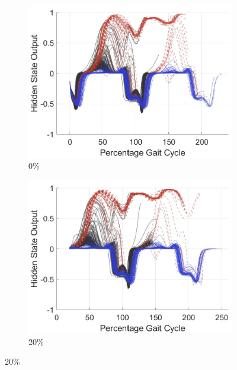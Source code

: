 \documentclass[sensors,article,submit,moreauthors,pdftex]{Definitions/mdpi}
\begin{document}
\begin{figure}[!hbt]
     \centering
     \begin{subfigure}[b]{0.32\textwidth}
         \centering
         \includegraphics[width=\textwidth]{Figures/results/hidden_state/gyro_y_sa_v_w-sd/0_Participant_04.jpg}
         \caption{0\%}
         \label{subfig:gyro_y_w_v_sa_sd_0}
     \end{subfigure}
     \hfill
     \begin{subfigure}[b]{0.32\textwidth}
         \centering
         \includegraphics[width=\textwidth]{Figures/results/hidden_state/gyro_y_sa_v_w-sd/20_Participant_04.jpg}
         \caption{20\%}
         \label{subfig:gyro_y_w_v_sa_sd_20}
     \end{subfigure}

\end{figure}
\end{document}
